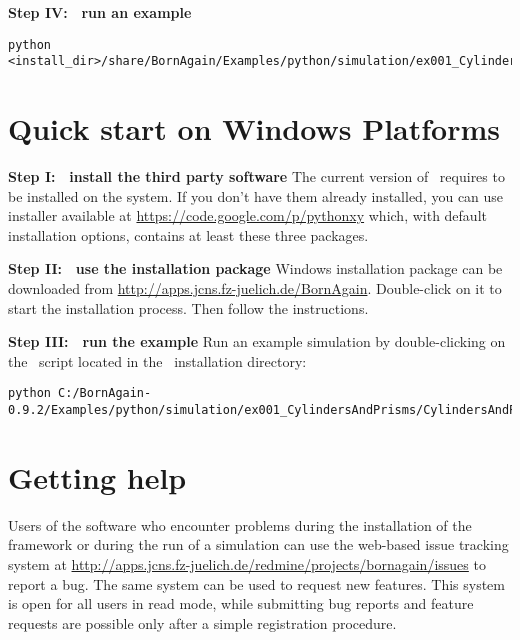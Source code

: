 \noindent
{\bf Step IV: $~$ run an example}
\begin{lstlisting}[language=shell, style=commandline]
python <install_dir>/share/BornAgain/Examples/python/simulation/ex001_CylindersAndPrisms/CylindersAndPrisms.py
\end{lstlisting}



\section{Quick start on Windows Platforms}

\noindent
{\bf Step I: $~$ install the third party software} \newline
The current version of \BornAgain\ requires  
to be installed on the system. If you don't have them already installed,
you can use  installer available 
at \url{https://code.google.com/p/pythonxy} which, with default installation options, contains at least these three packages.
\vspace*{2mm}

\noindent
{\bf Step II: $~$ use the installation package } \newline
Windows installation package can be downloaded from \url{http://apps.jcns.fz-juelich.de/BornAgain}.
Double-click on it to start the installation process. Then follow the instructions.
\vspace*{2mm}

\noindent
{\bf Step III: $~$ run the example} \newline
Run an example simulation by double-clicking on the \Python\ script located in the \BornAgain\ installation directory:
\begin{lstlisting}[language=shell, style=commandline]
python C:/BornAgain-0.9.2/Examples/python/simulation/ex001_CylindersAndPrisms/CylindersAndPrisms.py
\end{lstlisting}


\section{Getting help}
Users of the software who encounter problems during the installation
of the framework or during the run of a simulation can use the web-based issue tracking system
at
\url{http://apps.jcns.fz-juelich.de/redmine/projects/bornagain/issues}
to report a bug. The same system can be used to request new features.
This system is open for all users in read mode, while 
submitting bug reports and feature requests are possible only after a simple registration
procedure.






